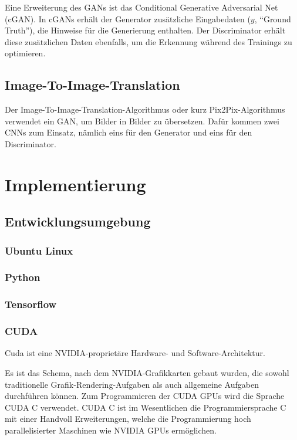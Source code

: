 Eine Erweiterung des GANs ist das Conditional Generative Adversarial Net (cGAN). In cGANs erhält der Generator zusätzliche Eingabedaten ($y$, ``Ground Truth''), die Hinweise für die Generierung enthalten. Der Discriminator erhält diese zusätzlichen Daten ebenfalls, um die Erkennung während des Trainings zu optimieren. \cite{mirza2014conditional}

\section{Image-To-Image-Translation}
\label{sec:pix2pix}
Der Image-To-Image-Translation-Algorithmus oder kurz Pix2Pix-Algorithmus verwendet
ein GAN, um Bilder in Bilder zu übersetzen. Dafür kommen zwei CNNs zum Einsatz, nämlich eins für den Generator und eins für den Discriminator.

\chapter{Implementierung}

\section{Entwicklungsumgebung}
\label{sec:env}

\subsection{Ubuntu Linux}
\label{subsec:ubuntu}

\subsection{Python}
\label{subsec:python}

\subsection{Tensorflow}
\label{subsec:tensorflow}

\subsection{CUDA}
\label{subsec:cuda}
Cuda ist eine NVIDIA-proprietäre Hardware- und Software-Architektur. 

Es ist das Schema, nach dem NVIDIA-Grafikkarten gebaut wurden, die sowohl traditionelle Grafik-Rendering-Aufgaben als auch allgemeine Aufgaben durchführen können. Zum Programmieren der CUDA GPUs wird die Sprache CUDA C verwendet. CUDA C ist im Wesentlichen die Programmiersprache C mit einer Handvoll Erweiterungen, welche die Programmierung hoch parallelisierter Maschinen wie NVIDIA GPUs ermöglichen. \cite{sanders2010cuda}

